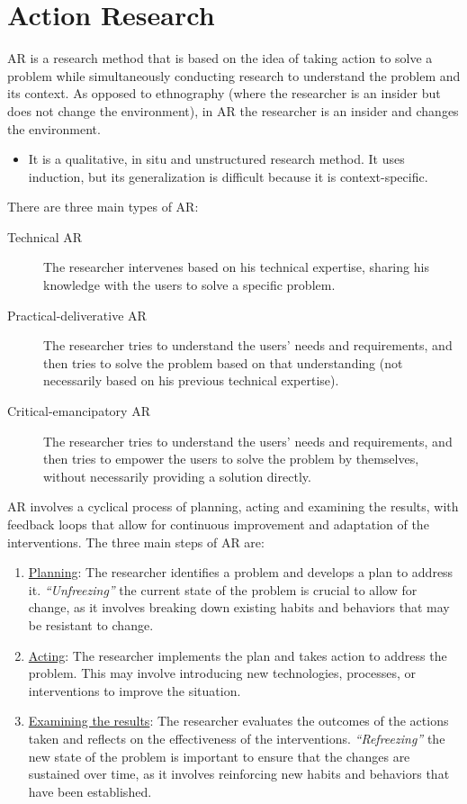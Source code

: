 \section{Action Research}

AR is a research method that is based on the idea of taking action to solve a problem while simultaneously conducting research to understand the problem and its context. As opposed to ethnography (where the researcher is an insider but does not change the environment), in AR the researcher is an insider and changes the environment.
\begin{itemize}
    \item It is a qualitative, in situ and unstructured research method. It uses induction, but its generalization is difficult because it is context-specific.
\end{itemize}

There are three main types of AR:
\begin{description}
    \item[Technical AR] The researcher intervenes based on his technical expertise, sharing his knowledge with the users to solve a specific problem.
    \item[Practical-deliverative AR] The researcher tries to understand the users' needs and requirements, and then tries to solve the problem based on that understanding (not necessarily based on his previous technical expertise).
    \item[Critical-emancipatory AR] The researcher tries to understand the users' needs and requirements, and then tries to empower the users to solve the problem by themselves, without necessarily providing a solution directly.
\end{description}

AR involves a cyclical process of planning, acting and examining the results, with feedback loops that allow for continuous improvement and adaptation of the interventions. The three main steps of AR are:
\begin{enumerate}
    \item \ul{Planning}: The researcher identifies a problem and develops a plan to address it. \emph{``Unfreezing''} the current state of the problem is crucial to allow for change, as it involves breaking down existing habits and behaviors that may be resistant to change.
    \item \ul{Acting}: The researcher implements the plan and takes action to address the problem. This may involve introducing new technologies, processes, or interventions to improve the situation.
    \item \ul{Examining the results}: The researcher evaluates the outcomes of the actions taken and reflects on the effectiveness of the interventions. \emph{``Refreezing''} the new state of the problem is important to ensure that the changes are sustained over time, as it involves reinforcing new habits and behaviors that have been established.
\end{enumerate}

